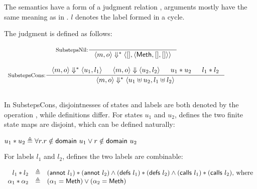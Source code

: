 The \Substeps{} semantics have a form of a judgment relation
, arguments mostly have the same meaning as in
\Substep{}. $l$ denotes the label formed in a cycle.

\begin{definition}
  \label{def-semsss}
  The judgment  is defined as follows:
  \begin{center}
    \begin{math}
      \begin{array}{c}
        \inference[SubstepsNil:]{}
                  {\semsss{m}{o}{\emptymap}
                    {\semlbl{\alphameth}{\emptymap}{\emptymap}}} \\
        \mbox{} \\
        \inference[SubstepsCons:]{\semsss{m}{o}{u_1}{l_1} & \semsstepr{m}{o}{u_2}{l_2} & \sdisj{u_1}{u_2} & \ldisj{l_1}{l_2}}
                  {\semsss{m}{o}{\splus{u_1}{u_2}}{\lplus{l_1}{l_2}}} \\
        \mbox{} \\
      \end{array}
    \end{math}
  \end{center}
\end{definition}

In SubstepsCons, disjointnesses of states and labels are both denoted
by the operation \sdisj{}{}, while definitions differ. For states
$u_1$ and $u_2$,  defines the two finite state maps
are disjoint, which can be defined naturally:

\begin{center}
  \begin{math}
    u_1 \ast u_2 \triangleq \forall r. r \notin \textsf{domain}\ u_1 \vee r \notin \textsf{domain}\ u_2
  \end{math}
\end{center}

For labels $l_1$ and $l_2$,  defines the two labels
are combinable:

\begin{definition}
  \label{def-ldisj}
  \mbox{}
  \begin{center}
    \begin{math}
      \begin{array}{rcl}
        l_1 \ast l_2 & \triangleq &
        (\textsf{annot}\ l_1) \ast (\textsf{annot}\ l_2) \wedge
        (\textsf{defs}\ l_1) \ast (\textsf{defs}\ l_2) \wedge
        (\textsf{calls}\ l_1) \ast (\textsf{calls}\ l_2) \textrm{, where} \\
        \alpha_1 \ast \alpha_2 & \triangleq &
        (\alpha_1 = \textsf{Meth}) \vee (\alpha_2 = \textsf{Meth}) \\
      \end{array}
    \end{math}
  \end{center}
\end{definition}


